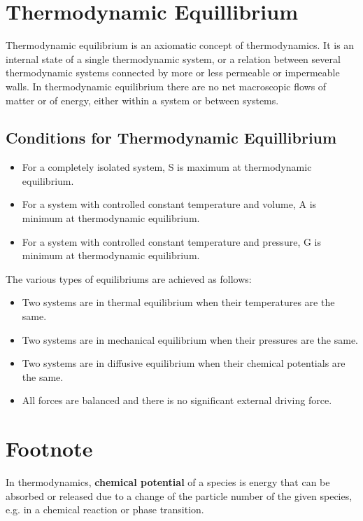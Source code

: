 \documentclass[]{article}
\begin{document}
\section{Thermodynamic Equillibrium}
Thermodynamic equilibrium is an axiomatic concept of thermodynamics. It is an internal state of a single thermodynamic system, or a relation between several thermodynamic systems connected by more or less permeable or impermeable walls. In thermodynamic equilibrium there are no net macroscopic flows of matter or of energy, either within a system or between systems. 

\subsection{Conditions for Thermodynamic Equillibrium}
\begin{itemize}
\item For a completely isolated system, S is maximum at thermodynamic equilibrium.
\item For a system with controlled constant temperature and volume, A is minimum at thermodynamic equilibrium.
\item For a system with controlled constant temperature and pressure, G is minimum at thermodynamic equilibrium.
\end{itemize}
The various types of equilibriums are achieved as follows:
\begin{itemize}
\item Two systems are in thermal equilibrium when their temperatures are the same.
\item Two systems are in mechanical equilibrium when their pressures are the same.
\item Two systems are in diffusive equilibrium when their chemical potentials are the same.
\item All forces are balanced and there is no significant external driving force.
\end{itemize}
\section*{Footnote}
In thermodynamics, \textbf{chemical potential} of a species is energy that can be absorbed or released due to a change of the particle number of the given species, e.g. in a chemical reaction or phase transition.
\end{document}
